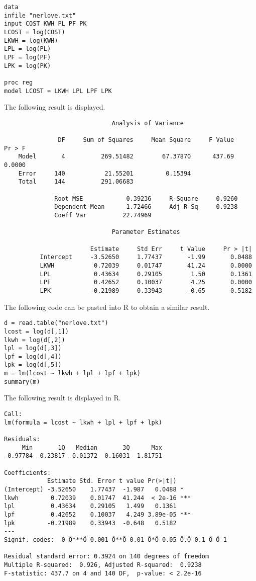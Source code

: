 \documentclass[12pt]{article}
\begin{document}
\begin{Verbatim}
data
infile "nerlove.txt"
input COST KWH PL PF PK
LCOST = log(COST)
LKWH = log(KWH)
LPL = log(PL)
LPF = log(PF)
LPK = log(PK)

proc reg
model LCOST = LKWH LPL LPF LPK
\end{Verbatim}

The following result is displayed.

\begin{Verbatim}
                              Analysis of Variance

               DF     Sum of Squares     Mean Square     F Value     Pr > F
    Model       4          269.51482        67.37870      437.69     0.0000
    Error     140           21.55201         0.15394                       
    Total     144          291.06683                                       

              Root MSE            0.39236     R-Square     0.9260
              Dependent Mean      1.72466     Adj R-Sq     0.9238
              Coeff Var          22.74969                        

                              Parameter Estimates

                        Estimate     Std Err     t Value     Pr > |t|
          Intercept     -3.52650     1.77437       -1.99       0.0488
          LKWH           0.72039     0.01747       41.24       0.0000
          LPL            0.43634     0.29105        1.50       0.1361
          LPF            0.42652     0.10037        4.25       0.0000
          LPK           -0.21989     0.33943       -0.65       0.5182
\end{Verbatim}

The following code can be pasted into R to obtain a similar result.

\begin{Verbatim}
d = read.table("nerlove.txt")
lcost = log(d[,1])
lkwh = log(d[,2])
lpl = log(d[,3])
lpf = log(d[,4])
lpk = log(d[,5])
m = lm(lcost ~ lkwh + lpl + lpf + lpk)
summary(m)
\end{Verbatim}

The following result is displayed in R.

\begin{Verbatim}
Call:
lm(formula = lcost ~ lkwh + lpl + lpf + lpk)

Residuals:
     Min       1Q   Median       3Q      Max 
-0.97784 -0.23817 -0.01372  0.16031  1.81751 

Coefficients:
            Estimate Std. Error t value Pr(>|t|)    
(Intercept) -3.52650    1.77437  -1.987   0.0488 *  
lkwh         0.72039    0.01747  41.244  < 2e-16 ***
lpl          0.43634    0.29105   1.499   0.1361    
lpf          0.42652    0.10037   4.249 3.89e-05 ***
lpk         -0.21989    0.33943  -0.648   0.5182    
---
Signif. codes:  0 Ô***Õ 0.001 Ô**Õ 0.01 Ô*Õ 0.05 Ô.Õ 0.1 Ô Õ 1

Residual standard error: 0.3924 on 140 degrees of freedom
Multiple R-squared:  0.926,	Adjusted R-squared:  0.9238 
F-statistic: 437.7 on 4 and 140 DF,  p-value: < 2.2e-16
\end{Verbatim}
\end{document}
